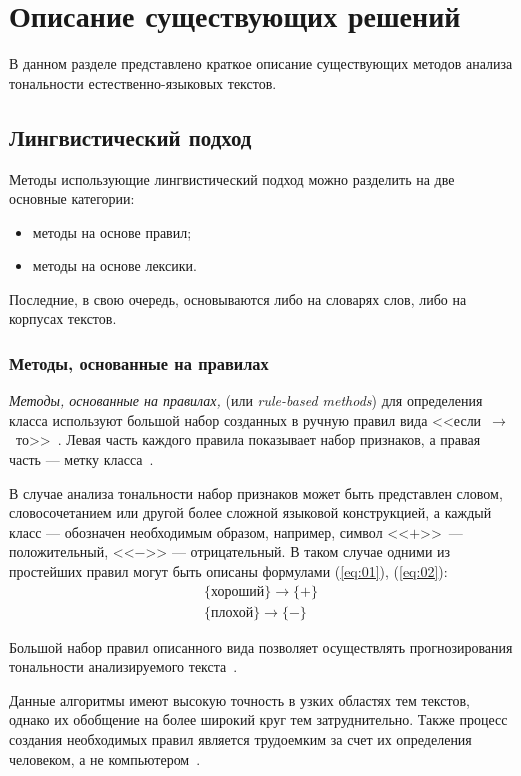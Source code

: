 \chapter{Описание существующих решений}

В данном разделе представлено краткое описание существующих методов анализа
тональности естественно-языковых текстов.

\section{Лингвистический подход}

Методы использующие лингвистический подход можно разделить на две основные
категории:
\begin{itemize}
    \item методы на основе правил;
    \item методы на основе лексики.
\end{itemize}

Последние, в свою очередь, основываются либо на словарях слов, либо на корпусах
текстов.

\subsection{Методы, основанные на правилах}

\textit{Методы, основанные на правилах,} (или \textit{rule-based methods}) для
определения класса используют большой набор созданных в ручную правил
вида <<если~$\rightarrow$~то>>~\cite{article09}. Левая часть каждого правила
показывает набор признаков, а правая часть --- метку класса~\cite{article10}.

В случае анализа тональности набор признаков может быть представлен словом,
словосочетанием или другой более сложной языковой конструкцией, а каждый класс
--- обозначен необходимым образом, например, символ <<$+$>>\ --- положительный,
<<$-$>> --- отрицательный. В таком случае одними из простейших
правил могут быть описаны формулами (\ref{eq:01}), (\ref{eq:02}):
\begin{eqnarray}
    \{\text{хороший}\} \rightarrow \{+\}\label{eq:01}\\
    \{\text{плохой}\} \rightarrow \{-\}\label{eq:02}
\end{eqnarray}

Большой набор правил описанного вида позволяет осуществлять
прогнозирования тональности анализируемого текста~\cite{article11}.

Данные алгоритмы имеют высокую точность в узких областях тем текстов, однако их
обобщение на более широкий круг тем затруднительно. Также процесс создания
необходимых правил является трудоемким за счет их определения человеком, а не
компьютером~\cite{article12}.

